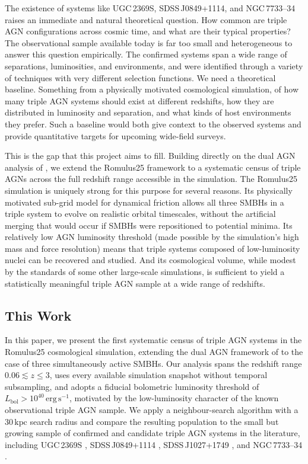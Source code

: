\documentclass[twocolumn, 10pt]{article}
\begin{document}
The existence of systems like UGC\,2369S, SDSS\,J0849+1114, and NGC\,7733--34 raises an immediate and natural theoretical question. How common are triple AGN configurations across cosmic time, and what are their typical properties? The observational sample available today is far too small and heterogeneous to answer this question empirically. The confirmed systems span a wide range of separations, luminosities, and environments, and were identified through a variety of techniques with very different selection functions. We need a theoretical baseline. Something from a physically motivated cosmological simulation, of how many triple AGN systems should exist at different redshifts, how they are distributed in luminosity and separation, and what kinds of host environments they prefer. Such a baseline would both give context to the observed systems and provide quantitative targets for upcoming wide-field surveys.
 
This is the gap that this project aims to fill. Building directly on the dual AGN analysis of \citet{Saeedzadeh2024}, we extend the Romulus25 framework to a systematic census of triple AGNs across the full redshift range accessible in the simulation. The Romulus25 simulation is uniquely strong for this purpose for several reasons. Its physically motivated sub-grid model for dynamical friction allows all three SMBHs in a triple system to evolve on realistic orbital timescales, without the artificial merging that would occur if SMBHs were repositioned to potential minima. Its relatively low AGN luminosity threshold (made possible by the simulation's high mass and force resolution) means that triple systems composed of low-luminosity nuclei can be recovered and studied. And its cosmological volume, while modest by the standards of some other large-scale simulations, is sufficient to yield a statistically meaningful triple AGN sample at a wide range of redshifts.
 

\subsection{This Work}
\label{subsec:this_work}

In this paper, we present the first systematic census of triple AGN systems in the Romulus25 cosmological simulation, extending the dual AGN framework of \citet{Saeedzadeh2024} to the case of three simultaneously active SMBHs. Our analysis spans the redshift range $0.06 \lesssim z \leq 3$, uses every available simulation snapshot without temporal subsampling, and adopts a fiducial bolometric luminosity threshold of $L_\mathrm{bol} > 10^{40}\,\mathrm{erg\,s^{-1}}$, motivated by the low-luminosity character of the known observational triple AGN sample. We apply a neighbour-search algorithm with a $30\,\mathrm{kpc}$ search radius and compare the resulting population to the small but growing sample of confirmed and candidate triple AGN systems in the literature, including UGC\,2369S \citep{Ding2025}, SDSS\,J0849+1114 \citep{Pfeifle2019}, SDSS\,J1027+1749 \citep{Liu2011}, and NGC\,7733--34 \citep{Keshri2025}.
\end{document}

